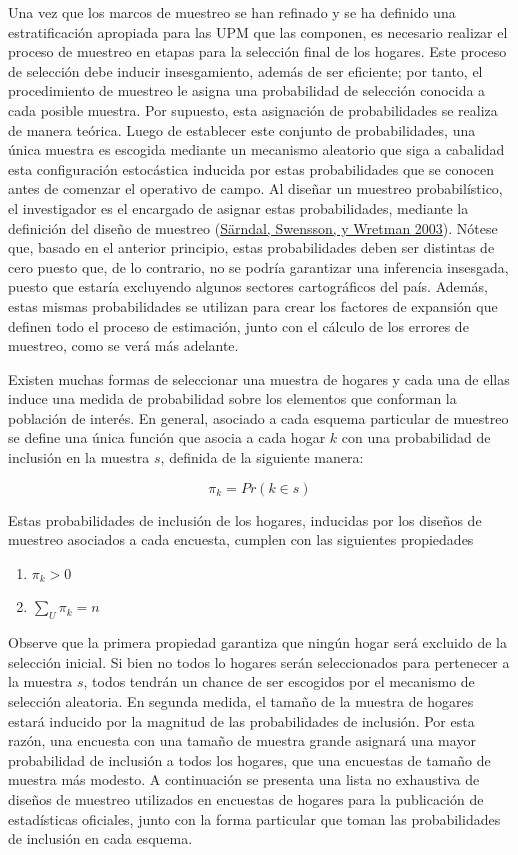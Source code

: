 \documentclass[
  12pt,
  spanish,
]{book}
\providecommand{\tightlist}{%
  \setlength{\itemsep}{0pt}\setlength{\parskip}{0pt}}
\begin{document}
Una vez que los marcos de muestreo se han refinado y se ha definido una estratificación apropiada para las UPM que las componen, es necesario realizar el proceso de muestreo en etapas para la selección final de los hogares. Este proceso de selección debe inducir insesgamiento, además de ser eficiente; por tanto, el procedimiento de muestreo le asigna una probabilidad de selección conocida a cada posible muestra. Por supuesto, esta asignación de probabilidades se realiza de manera teórica. Luego de establecer este conjunto de probabilidades, una única muestra es escogida mediante un mecanismo aleatorio que siga a cabalidad esta configuración estocástica inducida por estas probabilidades que se conocen antes de comenzar el operativo de campo. Al diseñar un muestreo probabilístico, el investigador es el encargado de asignar estas probabilidades, mediante la definición del diseño de muestreo (\protect\hyperlink{ref-Sarndal_Swensson_Wretman_2003}{Särndal, Swensson, y Wretman 2003}). Nótese que, basado en el anterior principio, estas probabilidades deben ser distintas de cero puesto que, de lo contrario, no se podría garantizar una inferencia insesgada, puesto que estaría excluyendo algunos sectores cartográficos del país. Además, estas mismas probabilidades se utilizan para crear los factores de expansión que definen todo el proceso de estimación, junto con el cálculo de los errores de muestreo, como se verá más adelante.

Existen muchas formas de seleccionar una muestra de hogares y cada una de ellas induce una medida de probabilidad sobre los elementos que conforman la población de interés. En general, asociado a cada esquema particular de muestreo se define una única función que asocia a cada hogar \(k\) con una probabilidad de inclusión en la muestra \(s\), definida de la siguiente manera:

\[\pi_k = Pr (k \in s)\]

Estas probabilidades de inclusión de los hogares, inducidas por los diseños de muestreo asociados a cada encuesta, cumplen con las siguientes propiedades

\begin{enumerate}
\def\labelenumi{\arabic{enumi}.}
\tightlist
\item
  \(\pi_k > 0\)
\item
  \(\sum_U \pi_k = n\)
\end{enumerate}

Observe que la primera propiedad garantiza que ningún hogar será excluido de la selección inicial. Si bien no todos lo hogares serán seleccionados para pertenecer a la muestra \(s\), todos tendrán un chance de ser escogidos por el mecanismo de selección aleatoria. En segunda medida, el tamaño de la muestra de hogares estará inducido por la magnitud de las probabilidades de inclusión. Por esta razón, una encuesta con una tamaño de muestra grande asignará una mayor probabilidad de inclusión a todos los hogares, que una encuestas de tamaño de muestra más modesto. A continuación se presenta una lista no exhaustiva de diseños de muestreo utilizados en encuestas de hogares para la publicación de estadísticas oficiales, junto con la forma particular que toman las probabilidades de inclusión en cada esquema.
\end{document}
